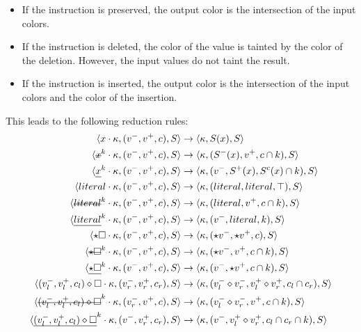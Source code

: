 \documentclass[a4paper,11pt]{article}
\newcommand\mathst[1]{\text{\st{$#1$}}}
\newcommand\mathul[1]{\text{\ul{$#1$}}}
\newcommand\rtstate[3]{\langle #1, #2, #3\rangle}
\newcommand\yrg[1]{}%
\begin{document}
\begin{itemize}
  \item
    If the instruction is preserved, the output color is the
    intersection of the input colors.

  \item
    If the instruction is deleted, the color of the value is tainted
    by the color of the deletion. However, the input values do not
    taint the result.

  \item
    If the instruction is inserted, the output color is the
    intersection of the input colors and the color of the insertion.
\end{itemize}
\yrg{The justifications are missing.}

This leads to the following reduction rules:
\begin{align*}
\rtstate{x \cdot \kappa}{(v^-, v^+, c)}{S} &\rightarrow \rtstate{\kappa}{S(x)}{S}\\
\rtstate{\mathst{x}^k \cdot \kappa}{(v^-, v^+, c)}{S} &\rightarrow \rtstate{\kappa}{(S^-(x), v^+, c \cap k)}{S}\\
\rtstate{\mathul{x}^k \cdot \kappa}{(v^-, v^+, c)}{S} &\rightarrow \rtstate{\kappa}{(v^-, S^+(x), S^c(x) \cap k)}{S}\\
\rtstate{literal \cdot \kappa}{(v^-, v^+, c)}{S} &\rightarrow \rtstate{\kappa}{(literal, literal, \top)}{S}\\
\rtstate{\mathst{literal}^k \cdot \kappa}{(v^-, v^+, c)}{S} &\rightarrow \rtstate{\kappa}{(literal, v^+, c \cap k)}{S}\\
\rtstate{\mathul{literal}^k \cdot \kappa}{(v^-, v^+, c)}{S} &\rightarrow \rtstate{\kappa}{(v^-, literal, k)}{S}\\
\rtstate{\star \square \cdot \kappa}{(v^-, v^+, c)}{S} &\rightarrow \rtstate{\kappa}{(\star v^-, \star v^+, c)}{S}\\
\rtstate{\mathst{\star \square}^k \cdot \kappa}{(v^-, v^+, c)}{S} &\rightarrow \rtstate{\kappa}{(\star v^-, v^+, c \cap k)}{S}\\
\rtstate{\mathul{\star \square}^k \cdot \kappa}{(v^-, v^+, c)}{S} &\rightarrow \rtstate{\kappa}{(v^-, \star v^+, c \cap k)}{S}\\
\rtstate{(v_l^-, v_l^+, c_l) \diamond \square \cdot \kappa}{(v_r^-, v_r^+, c_r)}{S} &\rightarrow \rtstate{\kappa}{(v_l^- \diamond v_r^-, v_l^+ \diamond v_r^+, c_l \cap c_r)}{S}\\
\rtstate{\mathst{(v_l^-, v_l^+, c_l) \diamond \square}^k \cdot \kappa}{(v_r^-, v^+, c)}{S} &\rightarrow \rtstate{\kappa}{(v_l^- \diamond v_r^-, v^+, c \cap k)}{S}\\
\rtstate{\mathul{(v_l^-, v_l^+, c_l) \diamond \square}^k \cdot \kappa}{(v^-, v_r^+, c_r)}{S} &\rightarrow \rtstate{\kappa}{(v^-, v_l^+ \diamond v_r^+, c_l \cap c_r \cap k)}{S}\\
\end{align*}
\end{document}
